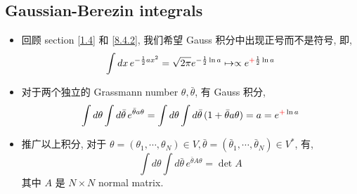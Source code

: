 \subsection{Gaussian-Berezin integrals}
\begin{itemize}
	\item 回顾 section \ref{1.4} 和 \eqref{8.4.2}, 我们希望 Gauss 积分中出现正号而不是符号, 即,
	\begin{equation}
		\int dx \, e^{- \frac{1}{2} a x^2} = \sqrt{2 \pi} e^{- \frac{1}{2} \ln a} \mapsto \propto e^{\mathcolor{red}{+} \frac{1}{2} \ln a}
	\end{equation}
	
	\item 对于两个独立的 Grassmann number $\theta, \bar{\theta}$, 有 Gauss 积分,
	\begin{equation}
		\int d\theta \int d\bar{\theta} \, e^{\bar{\theta} a \theta} = \int d\theta \int d\bar{\theta} \, (1 + \bar{\theta} a \theta) = a = e^{\mathcolor{red}{+} \ln a}
	\end{equation}
	
	\item 推广以上积分, 对于 $\theta = (\theta_1, \cdots, \theta_N) \in V, \bar{\theta} = (\bar{\theta}_1, \cdots, \bar{\theta}_N) \in V^*$, 有,
	\begin{equation}
		\int d\theta \int d\bar{\theta} \, e^{\bar{\theta} A \theta} = \det A
	\end{equation}
	其中 $A$ 是 $N \times N$ normal matrix.
	

\end{itemize}
